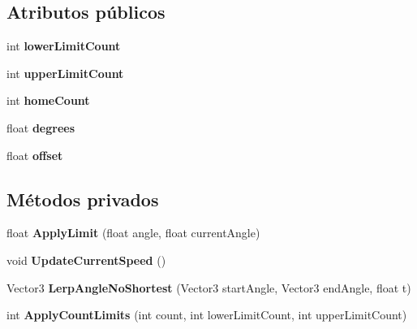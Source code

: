 \subsection*{Atributos públicos}
\begin{DoxyCompactItemize}
\item 
\mbox{\label{class_articulation_ab6f41ba4973672807b535fac03c03a18}} 
int {\bfseries lower\+Limit\+Count}
\item 
\mbox{\label{class_articulation_a0ce352a643712286ef497bbea705ca4d}} 
int {\bfseries upper\+Limit\+Count}
\item 
\mbox{\label{class_articulation_aa91625a05579d28909f96473cbd02744}} 
int {\bfseries home\+Count}
\item 
\mbox{\label{class_articulation_ae611787f027dbde080c7530fa68d1eee}} 
float {\bfseries degrees}
\item 
\mbox{\label{class_articulation_a14c25a5ae970e12d63af0224be518556}} 
float {\bfseries offset}
\end{DoxyCompactItemize}
\subsection*{Métodos privados}
\begin{DoxyCompactItemize}
\item 
\mbox{\label{class_articulation_aeea905ad3cc4497d1dfac2695835d459}} 
float {\bfseries Apply\+Limit} (float angle, float current\+Angle)
\item 
\mbox{\label{class_articulation_a88aec688de1ef2c8b019709865be4383}} 
void {\bfseries Update\+Current\+Speed} ()
\item 
\mbox{\label{class_articulation_a434d6e06e4387f7b0c3feb445895cfea}} 
Vector3 {\bfseries Lerp\+Angle\+No\+Shortest} (Vector3 start\+Angle, Vector3 end\+Angle, float t)
\item 
\mbox{\label{class_articulation_a17400ddd138629071a5c240bba86c8f2}} 
int {\bfseries Apply\+Count\+Limits} (int count, int lower\+Limit\+Count, int upper\+Limit\+Count)
\end{DoxyCompactItemize}
